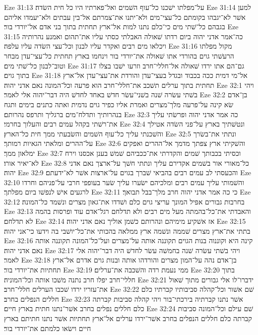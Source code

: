 Eze 31:13  על־מפלתו ישׁכנו כל־עוף השׁמים ואל־פארתיו היו כל חית השׂדה׃
Eze 31:14  למען אשׁר לא־יגבהו בקומתם כל־עצי־מים ולא־יתנו את־צמרתם אל־בין עבתים ולא־יעמדו אליהם בגבהם כל־שׁתי מים כי־כלם נתנו למות אל־ארץ תחתית בתוך בני אדם אל־יורדי בור׃
Eze 31:15  כה־אמר אדני יהוה ביום רדתו שׁאולה האבלתי כסתי עליו את־תהום ואמנע נהרותיה ויכלאו מים רבים ואקדר עליו לבנון וכל־עצי השׂדה עליו עלפה׃
Eze 31:16  מקול מפלתו הרעשׁתי גוים בהורדי אתו שׁאולה את־יורדי בור וינחמו בארץ תחתית כל־עצי־עדן מבחר וטוב־לבנון כל־שׁתי מים׃
Eze 31:17  גם־הם אתו ירדו שׁאולה אל־חללי־חרב וזרעו ישׁבו בצלו בתוך גוים׃
Eze 31:18  אל־מי דמית ככה בכבוד ובגדל בעצי־עדן והורדת את־עצי־עדן אל־ארץ תחתית בתוך ערלים תשׁכב את־חללי־חרב הוא פרעה וכל־המונה נאם אדני יהוה׃
Eze 32:1  ויהי בשׁתי עשׂרה שׁנה בשׁני־עשׂר חדשׁ באחד לחדשׁ היה דבר־יהוה אלי לאמר׃
Eze 32:2  בן־אדם שׂא קינה על־פרעה מלך־מצרים ואמרת אליו כפיר גוים נדמית ואתה כתנים בימים ותגח בנהרותיך ותדלח־מים ברגליך ותרפס נהרותם׃
Eze 32:3  כה אמר אדני יהוה ופרשׂתי עליך את־רשׁתי בקהל עמים רבים והעלוך בחרמי׃
Eze 32:4  ונטשׁתיך בארץ על־פני השׂדה אטילך והשׁכנתי עליך כל־עוף השׁמים והשׂבעתי ממך חית כל־הארץ׃
Eze 32:5  ונתתי את־בשׂרך על־ההרים ומלאתי הגאיות רמותך׃
Eze 32:6  והשׁקיתי ארץ צפתך מדמך אל־ההרים ואפקים ימלאון ממך׃
Eze 32:7  וכסיתי בכבותך שׁמים והקדרתי את־ככביהם שׁמשׁ בענן אכסנו וירח לא־יאיר אורו׃
Eze 32:8  כל־מאורי אור בשׁמים אקדירם עליך ונתתי חשׁך על־ארצך נאם אדני יהוה׃
Eze 32:9  והכעסתי לב עמים רבים בהביאי שׁברך בגוים על־ארצות אשׁר לא־ידעתם׃
Eze 32:10  והשׁמותי עליך עמים רבים ומלכיהם ישׂערו עליך שׂער בעופפי חרבי על־פניהם וחרדו לרגעים אישׁ לנפשׁו ביום מפלתך׃
Eze 32:11  כי כה אמר אדני יהוה חרב מלך־בבל תבואך׃
Eze 32:12  בחרבות גבורים אפיל המונך עריצי גוים כלם ושׁדדו את־גאון מצרים ונשׁמד כל־המונה׃
Eze 32:13  והאבדתי את־כל־בהמתה מעל מים רבים ולא תדלחם רגל־אדם עוד ופרסות בהמה לא תדלחם׃
Eze 32:14  אז אשׁקיע מימיהם ונהרותם כשׁמן אוליך נאם אדני יהוה׃
Eze 32:15  בתתי את־ארץ מצרים שׁממה ונשׁמה ארץ ממלאה בהכותי את־כל־יושׁבי בה וידעו כי־אני יהוה׃
Eze 32:16  קינה היא וקוננוה בנות הגוים תקוננה אותה על־מצרים ועל־כל־המונה תקוננה אותה נאם אדני יהוה׃
Eze 32:17  ויהי בשׁתי עשׂרה שׁנה בחמשׁה עשׂר לחדשׁ היה דבר־יהוה אלי לאמר׃
Eze 32:18  בן־אדם נהה על־המון מצרים והורדהו אותה ובנות גוים אדרם אל־ארץ תחתיות את־יורדי בור׃
Eze 32:19  ממי נעמת רדה והשׁכבה את־ערלים׃
Eze 32:20  בתוך חללי־חרב יפלו חרב נתנה משׁכו אותה וכל־המוניה׃
Eze 32:21  ידברו־לו אלי גבורים מתוך שׁאול את־עזריו ירדו שׁכבו הערלים חללי־חרב׃
Eze 32:22  שׁם אשׁור וכל־קהלה סביבותיו קברתיו כלם חללים הנפלים בחרב׃
Eze 32:23  אשׁר נתנו קברתיה בירכתי־בור ויהי קהלה סביבות קברתה כלם חללים נפלים בחרב אשׁר־נתנו חתית בארץ חיים׃
Eze 32:24  שׁם עילם וכל־המונה סביבות קברתה כלם חללים הנפלים בחרב אשׁר־ירדו ערלים אל־ארץ תחתיות אשׁר נתנו חתיתם בארץ חיים וישׂאו כלמתם את־יורדי בור׃
